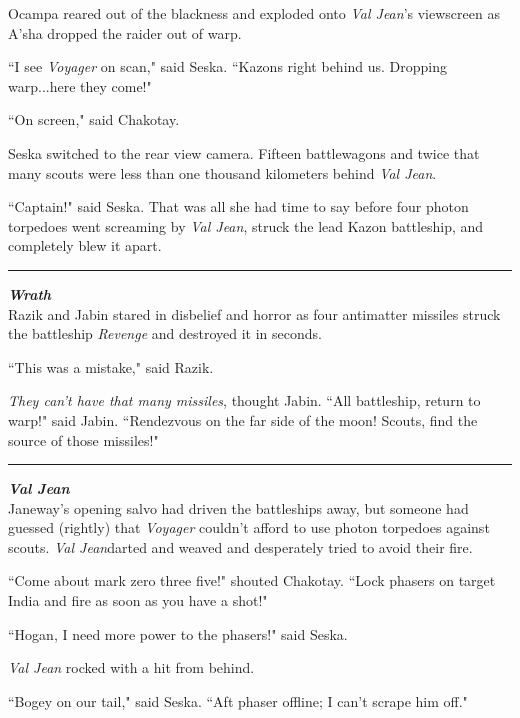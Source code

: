 \documentclass[twoside,letterpaper,12pt]{memoir}
\begin{document}
Ocampa reared out of the blackness and exploded onto \textit{Val Jean}'s viewscreen as A'sha dropped the raider out of warp.

``I see \textit{Voyager} on scan," said Seska. ``Kazons right behind us. Dropping warp...here they come!"

``On screen," said Chakotay.

Seska switched to the rear view camera. Fifteen battlewagons and twice that many scouts were less than one thousand kilometers behind \textit{Val Jean}.

``Captain!" said Seska. That was all she had time to say before four photon torpedoes went screaming by \textit{Val Jean}, struck the lead Kazon battleship, and completely blew it apart.

\begin{center}\rule{3cm}{0.4 pt}\end{center}

\noindent\textit{\textbf{Wrath}}\\

Razik and Jabin stared in disbelief and horror as four antimatter missiles struck the battleship \textit{Revenge} and destroyed it in seconds.

``This was a mistake," said Razik.

\textit{They can't have that many missiles}, thought Jabin. ``All battleship, return to warp!" said Jabin. ``Rendezvous on the far side of the moon! Scouts, find the source of those missiles!"

\begin{center}\rule{3cm}{0.4 pt}\end{center}

\noindent\textit{\textbf{Val Jean}}\\

Janeway's opening salvo had driven the battleships away, but someone had guessed (rightly) that \textit{Voyager} couldn't afford to use photon torpedoes against scouts. \textit{Val Jean}darted and weaved and desperately tried to avoid their fire.

``Come about mark zero three five!" shouted Chakotay. ``Lock phasers on target India and fire as soon as you have a shot!"

``Hogan, I need more power to the phasers!" said Seska.

\textit{Val Jean} rocked with a hit from behind.

``Bogey on our tail," said Seska. ``Aft phaser offline; I can't scrape him off."
\end{document}
